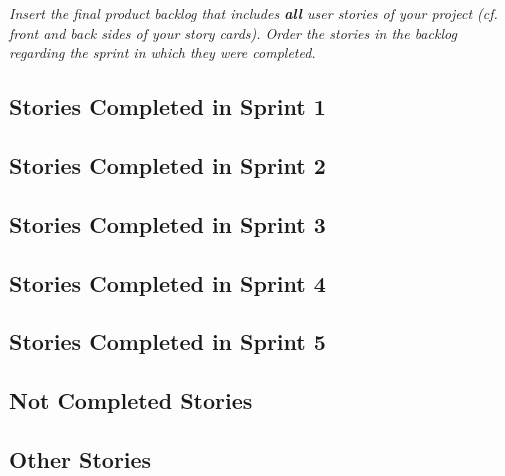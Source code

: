 \emph{Insert the final product backlog that includes \textbf{all} user stories of your project (cf. front and back sides of your story cards). Order the stories in the backlog regarding the sprint in which they were completed.}

\subsection{Stories Completed in Sprint 1}


\subsection{Stories Completed in Sprint 2}


\subsection{Stories Completed in Sprint 3}


\subsection{Stories Completed in Sprint 4}


\subsection{Stories Completed in Sprint 5}


\subsection{Not Completed Stories}


\subsection{Other Stories}
